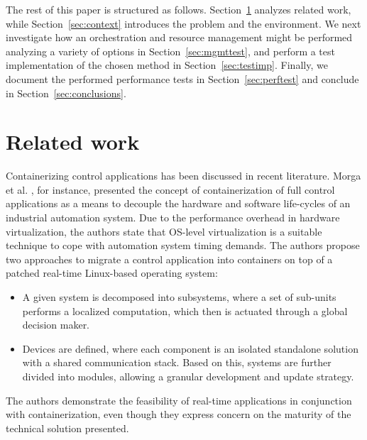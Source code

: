 \documentclass[]{scrartcl}
\begin{document}
The rest of this paper is structured as follows. Section~\ref{sec:relwork} analyzes related work, while Section~\ref{sec:context} introduces the problem and the environment.
We next investigate how an orchestration and resource management might be performed analyzing a variety of options in Section~\ref{sec:mgmttest}, and perform a test implementation of the chosen method in Section~\ref{sec:testimp}.
Finally, we document the performed performance tests in Section~\ref{sec:perftest} and conclude in Section~\ref{sec:conclusions}.

\section{Related work}
\label{sec:relwork}

Containerizing control applications has been discussed in recent literature. 
Morga et al. \cite{Mogaetal2016}, for instance, presented the concept of containerization of full control applications as a means to decouple the hardware and software life-cycles of an industrial automation system.
Due to the performance overhead in hardware virtualization, the authors state that OS-level virtualization is a suitable technique to cope with automation system timing demands.
The authors propose two approaches to migrate a control application into containers on top of a patched real-time Linux-based operating system: 
\begin{itemize}
	\item A given system is decomposed into subsystems, where a set of sub-units performs a localized computation, which then is actuated through a global decision maker. 
	\item Devices are defined, where each component is an isolated standalone solution with a shared communication stack.
	Based on this, systems are further divided into modules, allowing a granular development and update strategy. 
\end{itemize}
The authors demonstrate the feasibility of real-time applications in conjunction with containerization, even though they express concern on the maturity of the technical solution presented.
\end{document}
